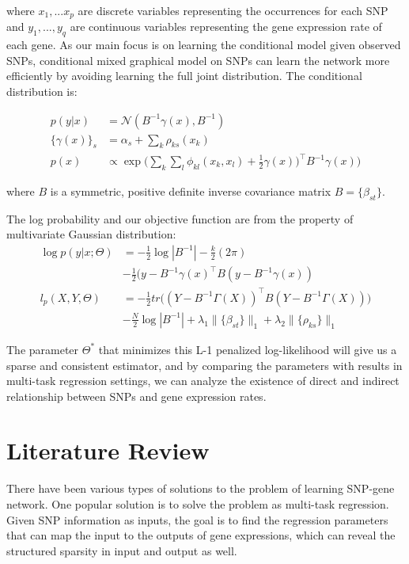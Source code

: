 \documentclass{article}
\begin{document}
where $x_1, ... x_p$ are discrete variables representing the occurrences for each SNP and $y_1, ..., y_q$ are continuous variables representing the gene expression rate of each gene. As our main focus is on learning the conditional model given observed SNPs, conditional mixed graphical model on SNPs can learn the network more efficiently by avoiding learning the full joint distribution. The conditional distribution is:

\begin{align}
p(y|x) &= \mathcal{N}(B^{-1}\gamma(x), B^{-1}) \label{eq:cond_prob}\\
\{\gamma(x)\}_s &= \alpha_s + \sum_{k} \rho_{ks}(x_k) \\
p(x) &\propto \exp \Big( \sum_{k} \sum_{l} \phi_{kl}(x_k, x_l) + \frac{1}{2} \gamma(x))^\intercal B^{-1} \gamma(x) \Big)
\end{align}

where $B$ is a symmetric, positive definite inverse covariance matrix $B = \{ \beta_{st}\}$.

The log probability and our objective function are from the property of multivariate Gaussian distribution:
\begin{align}
\log p(y | x; \Theta) &= -\frac{1}{2}\log |B^{-1}| -\frac{k}{2} (2 \pi) \nonumber    \\
& -\frac{1}{2} (y - B^{-1} \gamma(x)^\intercal B (y - B^{-1} \gamma(x)) \\
l_p(X, Y, \Theta) &= -\frac{1}{2} tr\Big((Y - B^{-1} \Gamma(X))^\intercal B (Y - B^{-1} \Gamma(X)) \Big) \nonumber \\
& -\frac{N}{2} \log|B^{-1}| + \lambda_1 \|\{\beta_{st}\}\|_1 + \lambda_2 \|\{\rho_{ks}\}\|_1 \label{eq:obj}
\end{align}

The parameter $\Theta^*$ that minimizes this L-1 penalized log-likelihood will give us a sparse and consistent estimator, and by comparing the parameters with results in multi-task regression settings, we can analyze the existence of direct and indirect relationship between SNPs and gene expression rates.

\section{Literature Review}

There have been various types of solutions to the problem of learning SNP-gene network. One popular solution is to solve the problem as multi-task regression.
Given SNP information as inputs, the goal is to find the regression parameters that can map the input to the outputs of gene expressions, which can reveal the structured sparsity in input and output as well.
\end{document}

